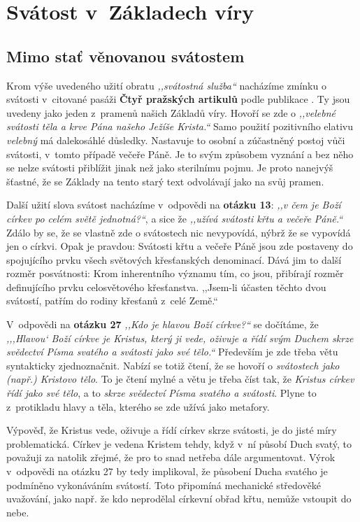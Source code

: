 \vspace{15mm}
\chapter{Svátost v~Základech víry}
\label{div:zaklady}

\section{Mimo stať věnovanou svátostem}

Krom výše uvedeného užití obratu \textit{,,svátostná služba``} nacházíme zmínku
o svátosti v~citované pasáži \textbf{Čtyř pražských artikulů} podle publikace \citet{bartos1951ctyri}. Ty jsou uvedeny jako jeden
z~pramenů našich Základů víry. Hovoří se zde o \textit{,,velebné svátosti těla a
krve Pána našeho Ježíše Krista.``} Samo použití pozitivního elativu
\textit{velebný} má dalekosáhlé důsledky. Nastavuje to osobní a zúčastněný
postoj vůči svátosti, v~tomto případě večeře Páně. Je to svým způsobem vyznání a
bez něho se nelze svátosti přiblížit jinak než jako sterilnímu pojmu. Je proto
nanejvýš šťastné, že se Základy na tento starý text odvolávají jako na svůj
pramen.

Další užití slova svátost nacházíme v~odpovědi na \textbf{otázku 13}: \textit{,,v čem je
Boží církev po celém světě jednotná?{}``}, a sice že \textit{,,užívá svátosti křtu
a večeře Páně.``} Zdálo by se, že se vlastně zde o svátostech nic nevypovídá,
nýbrž že se vypovídá jen o církvi. Opak je pravdou: Svátosti křtu a večeře Páně
jsou zde postaveny do spojujícího prvku všech světových křesťanských denominací.
Dává jim to další rozměr posvátnosti: Krom inherentního významu tím, co jsou,
přibírají rozměr definujícího prvku celosvětového křesťanstva. ,,Jsem-li účasten
těchto dvou svátostí, patřím do rodiny křesťanů z~celé Země.``

V~odpovědi na \textbf{otázku 27} \textit{,,Kdo je hlavou Boží církve?{}``} se dočítáme, že
\textit{,,{},Hlavou` Boží církve je Kristus, který ji vede, oživuje a řídí svým
Duchem skrze svědectví Písma svatého a svátosti jako své tělo.``} Především je
zde třeba větu syntakticky zjednoznačnit. Nabízí se totiž čtení, že se hovoří o
\textit{svátostech jako (např.) Kristovo tělo}. To je čtení mylné a větu je
třeba číst tak, že \textit{Kristus církev řídí jako své tělo}, a to
\textit{skrze svědectví Písma svatého a svátosti}. Plyne to z~protikladu hlavy a
těla, kterého se zde užívá jako metafory.

Výpověď, že Kristus vede, oživuje a řídí církev skrze svátosti, je do jisté míry
problematická. Církev je vedena Kristem tehdy, když v~ní působí Duch svatý, to
považuji za natolik zřejmé, že pro to snad netřeba dále argumentovat. Výrok
v~odpovědi na otázku 27 by tedy implikoval, že působení Ducha svatého je
podmíněno vykonáváním svátostí. Toto připomíná mechanické středověké uvažování,
jako např. že kdo neprodělal církevní obřad křtu, nemůže vstoupit do nebe.

